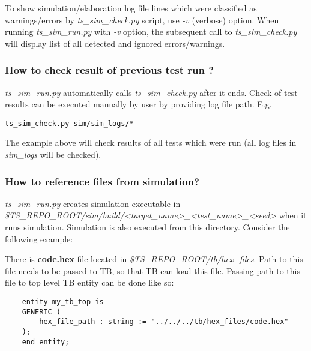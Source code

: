 \documentclass{tropic_design_spec}
\begin{document}
To show simulation/elaboration log file lines which were classified as warnings/errors by
\textit{ts_sim_check.py} script, use \textit{-v} (verbose) option. When running
\textit{ts_sim_run.py} with \textit{-v} option, the subsequent call to
\textit{ts_sim_check.py} will display list of all detected and ignored errors/warnings.


\subsubsection{How to check result of previous test run ?}
\label{sec:how-to-check-result-of-previous-test-run}

\textit{ts_sim_run.py} automatically calls \textit{ts_sim_check.py} after it ends. Check
of test results can be executed manually by user by providing log file path. E.g.

\begin{lstlisting}
ts_sim_check.py sim/sim_logs/*
\end{lstlisting}

The example above will check results of all tests which were run (all log files in
\textit{sim_logs} will be checked).


\subsubsection{How to reference files from simulation?}
\label{sec:how-to-reference-files-from-simulation}

\textit{ts_sim_run.py} creates simulation executable in
\textit{\$TS_REPO_ROOT/sim/build/<target_name>_<test_name>_<seed>} when it runs simulation.
Simulation is also executed from this directory. Consider the following example:

\vspace{0.5cm}

There is \textbf{code.hex} file located in \textit{\$TS_REPO_ROOT/tb/hex_files}. Path to
this file needs to be passed to TB, so that TB can load this file. Passing path to this
file to top level TB entity can be done like so:

\begin{lstlisting}
    entity my_tb_top is
    GENERIC (
        hex_file_path : string := "../../../tb/hex_files/code.hex"
    );
    end entity;
\end{lstlisting}
\end{document}
